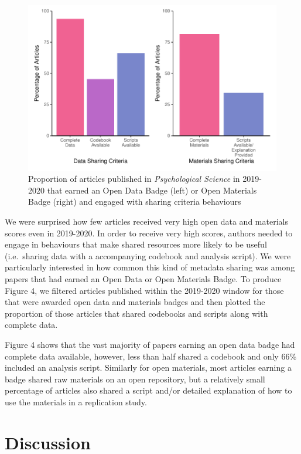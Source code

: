 \documentclass[
  english,
  man,floatsintext]{apa6}
\begin{document}
\begin{figure}
\centering
\includegraphics{icd_special_issue_revision_FINAL_files/figure-latex/unnamed-chunk-4-1.pdf}
\caption{\label{fig:unnamed-chunk-4}Proportion of articles published in \emph{Psychological Science} in 2019-2020 that earned an Open Data Badge (left) or Open Materials Badge (right) and engaged with sharing criteria behaviours}
\end{figure}

We were surprised how few articles received very high open data and materials scores even in 2019-2020. In order to receive very high scores, authors needed to engage in behaviours that make shared resources more likely to be useful (i.e.~sharing data with a accompanying codebook and analysis script). We were particularly interested in how common this kind of metadata sharing was among papers that had earned an Open Data or Open Materials Badge. To produce Figure 4, we filtered articles published within the 2019-2020 window for those that were awarded open data and materials badges and then plotted the proportion of those articles that shared codebooks and scripts along with complete data.

Figure 4 shows that the vast majority of papers earning an open data badge had complete data available, however, less than half shared a codebook and only 66\% included an analysis script. Similarly for open materials, most articles earning a badge shared raw materials on an open repository, but a relatively small percentage of articles also shared a script and/or detailed explanation of how to use the materials in a replication study.

\hypertarget{discussion}{%
\section{Discussion}\label{discussion}}
\end{document}
